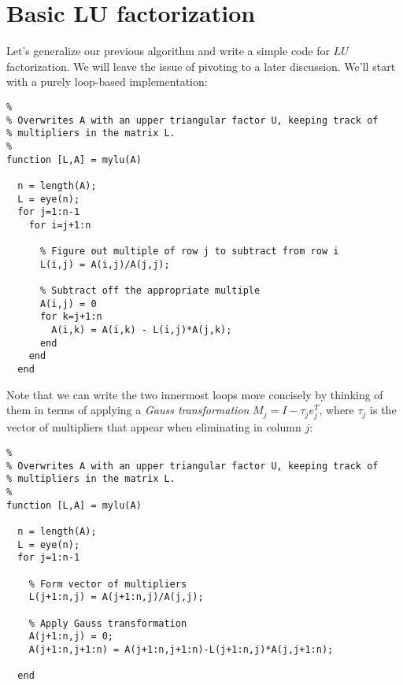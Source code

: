 \documentclass[12pt, leqno]{article} %
\begin{document}
\section{Basic LU factorization}

Let's generalize our previous algorithm and write a simple code for
$LU$ factorization.  We will leave the issue of pivoting to a later
discussion.  We'll start with a purely loop-based implementation:
\begin{lstlisting}
%
% Overwrites A with an upper triangular factor U, keeping track of
% multipliers in the matrix L.
%
function [L,A] = mylu(A)

  n = length(A);
  L = eye(n);
  for j=1:n-1
    for i=j+1:n

      % Figure out multiple of row j to subtract from row i
      L(i,j) = A(i,j)/A(j,j);

      % Subtract off the appropriate multiple
      A(i,j) = 0
      for k=j+1:n
        A(i,k) = A(i,k) - L(i,j)*A(j,k);
      end
    end
  end
\end{lstlisting}
Note that we can write the two innermost loops more concisely by
thinking of them in terms of applying a {\em Gauss
  transformation} $M_j = I - \tau_j e_j^T$, where $\tau_j$ is the
vector of multipliers that appear when eliminating in column $j$:
\begin{lstlisting}
%
% Overwrites A with an upper triangular factor U, keeping track of
% multipliers in the matrix L.
%
function [L,A] = mylu(A)

  n = length(A);
  L = eye(n);
  for j=1:n-1

    % Form vector of multipliers
    L(j+1:n,j) = A(j+1:n,j)/A(j,j);

    % Apply Gauss transformation
    A(j+1:n,j) = 0;
    A(j+1:n,j+1:n) = A(j+1:n,j+1:n)-L(j+1:n,j)*A(j,j+1:n);

  end
\end{lstlisting}
\end{document}
